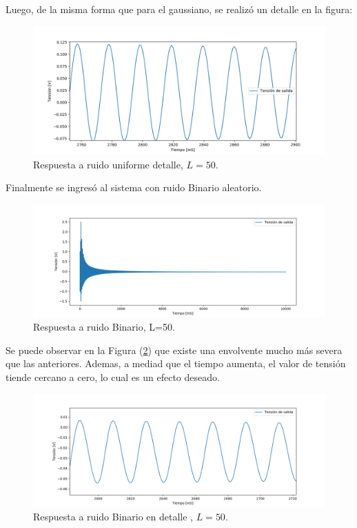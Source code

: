 Luego, de la misma forma que para el gaussiano, se realizó un detalle en la figura:
\begin{figure}[H]
	\centering
	\includegraphics[width=\textwidth]{ImagenesEjercicio4/uniformResponseDETAIL.PNG}
\caption{Respuesta a ruido uniforme detalle, $L=50$.}
	\label{fig:uniformed}
\end{figure}
Finalmente se ingresó al sistema con ruido Binario aleatorio.
\begin{figure}[H]
	\centering
	\includegraphics[width=\textwidth]{ImagenesEjercicio4/binaryResponse.PNG}
\caption{Respuesta a ruido Binario, L=50.}
	\label{fig:binary}
\end{figure}

Se puede observar en la Figura (\ref{fig:binary}) que existe una envolvente mucho más severa que las anteriores. Ademas, a mediad que el tiempo aumenta, el valor de tensión tiende cercano a cero, lo cual es un efecto deseado.
\begin{figure}[H]
	\centering
	\includegraphics[width=\textwidth]{ImagenesEjercicio4/binaryResponseDETAIL.PNG}
	\caption{Respuesta a ruido Binario en detalle , $L=50$.}
	\label{fig:binaryD}
\end{figure}

